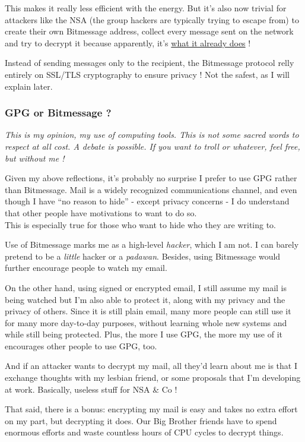 This makes it really less efficient with the energy. But it's also now
trivial for attackers like the NSA (the group hackers are typically
trying to escape from) to create their own Bitmessage address, collect
every message sent on the network and try to decrypt it because
apparently, it's
\href{http://www.nytimes.com/2013/09/06/us/nsa-foils-much-internet-encryption.html}{what
it already does} !

Instead of sending messages only to the recipient, the Bitmessage
protocol relly entirely on SSL/TLS cryptography to ensure privacy ! Not
the safest, as I will explain later.

\subsubsection{GPG or Bitmessage ?}\label{gpg-or-bitmessage}

\emph{This is my opinion, my use of computing tools. This is not some
sacred words to respect at all cost. A debate is possible. If you want
to troll or whatever, feel free, but without me !}

Given my above reflections, it's probably no surprise I prefer to use
GPG rather than Bitmessage. Mail is a widely recognized communications
channel, and even though I have ``no reason to hide'' - except privacy
concerns - I do understand that other people have motivations to want to
do so.\\This is especially true for those who want to hide who they are
writing to.

Use of Bitmessage marks me as a high-level \emph{hacker}, which I am
not. I can barely pretend to be a \emph{little} hacker or a
\emph{padawan}. Besides, using Bitmessage would further encourage people
to watch my email.

On the other hand, using signed or encrypted email, I still assume my
mail is being watched but I'm also able to protect it, along with my
privacy and the privacy of others. Since it is still plain email, many
more people can still use it for many more day-to-day purposes, without
learning whole new systems and while still being protected. Plus, the
more I use GPG, the more my use of it encourages other people to use
GPG, too.

And if an attacker wants to decrypt my mail, all they'd learn about me
is that I exchange thoughts with my lesbian friend, or some proposals
that I'm developing at work. Basically, useless stuff for NSA \& Co !

That said, there is a bonus: encrypting my mail is easy and takes no
extra effort on my part, but decrypting it does. Our Big Brother friends
have to spend enormous efforts and waste countless hours of CPU cycles
to decrypt things.

